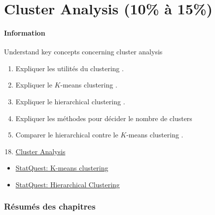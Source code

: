 \documentclass[12pt, titlepage, french]{report}
\begin{document}
\newpage
\chapter[Cluster Analysis]{Cluster Analysis (10\% à 15\%)}

\subsubsection{Information}

\begin{distributions}[Objective]
Understand key concepts concerning cluster analysis
\end{distributions}

\begin{outcomes}
\begin{enumerate}
	\item	Expliquer les utilités du \og clustering \fg{}.
	\item	Expliquer le \og $K$-means clustering \fg{}.
	\item	Expliquer le \og hierarchical clustering \fg{}.
	\item	Expliquer les méthodes pour décider le nombre de \og clusters \fg{} 
	\item	Comparer le \og hierarchical \fg{} contre le \og $K$-means clustering \fg{}.
\end{enumerate}
\end{outcomes}

\begin{ASM_chapter}
\begin{enumerate}
  \setcounter{enumi}{17}
	\item	\hyperref[CLUSTERS]{Cluster Analysis}
\end{enumerate}
\end{ASM_chapter}

\begin{YTB_vids}
\begin{itemize}
	\item	\href{https://www.youtube.com/watch?v=4b5d3muPQmA&list=PLblh5JKOoLUICTaGLRoHQDuF_7q2GfuJF&index=32}{StatQuest: K-means clustering}
	\item	\href{https://www.youtube.com/watch?v=7xHsRkOdVwo&list=PLblh5JKOoLUICTaGLRoHQDuF_7q2GfuJF&index=31}{StatQuest: Hierarchical Clustering}
\end{itemize}
\end{YTB_vids}

\subsection{Résumés des chapitres}
\end{document}
